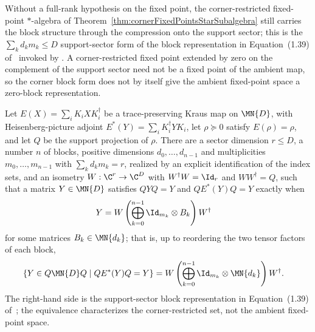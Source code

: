 Without a full-rank hypothesis on the fixed point, the corner-restricted
fixed-point $*$-algebra of
Theorem~\ref{thm:cornerFixedPointsStarSubalgebra} still carries the block
structure through the compression onto the support sector; this is the
$\sum_kd_km_k\leq D$ support-sector form of the block representation in
Equation~(1.39) of~\cite{Wolf2012Quantum} invoked by
\cite[Theorem~6.14]{Wolf2012Quantum}. A corner-restricted fixed point
extended by zero on the complement of the support sector need not be a fixed
point of the ambient map, so the corner block form does not by itself give
the ambient fixed-point space a zero-block representation.

\begin{theorem}%
    \label{thm:cornerFixedPoints_block_form}
    \leanok
    Let $E(X)=\sum_iK_iXK_i^\dagger$ be a trace-preserving Kraus map on
    $\MN{D}$, with Heisenberg-picture adjoint
    $E^*(Y)=\sum_iK_i^\dagger YK_i$, let $\rho\succeq0$ satisfy
    $E(\rho)=\rho$, and let $Q$ be the support projection of $\rho$. There
    are a sector dimension $r\leq D$, a number $n$ of blocks, positive
    dimensions $d_0,\ldots,d_{n-1}$ and multiplicities
    $m_0,\ldots,m_{n-1}$ with $\sum_kd_km_k=r$, realized by an explicit
    identification of the index sets, and an isometry
    $W:\C^r\to\C^D$ with $W^\dagger W=\Id_r$ and $WW^\dagger=Q$, such that
    a matrix $Y\in\MN{D}$ satisfies $QYQ=Y$ and $QE^*(Y)Q=Y$ exactly when
    \begin{align}
        Y
         & =W\left(\bigoplus_{k=0}^{n-1}
        \Id_{m_k}\otimes B_k\right)W^\dagger
        \label{eq:spectral_ds_corner_element}
    \end{align}
    for some matrices $B_k\in\MN{d_k}$; that is, up to reordering the two
    tensor factors of each block,
    \begin{align}
        \{Y\in Q\MN{D}Q\mid QE^*(Y)Q=Y\}
         & =W\left(\bigoplus_{k=0}^{n-1}
        \Id_{m_k}\otimes\MN{d_k}\right)W^\dagger.
        \label{eq:spectral_ds_corner_blocks}
    \end{align}
    The right-hand side is the support-sector block representation in
    Equation~(1.39) of~\cite{Wolf2012Quantum}; the equivalence characterizes
    the corner-restricted set, not the ambient fixed-point space.
\end{theorem}

